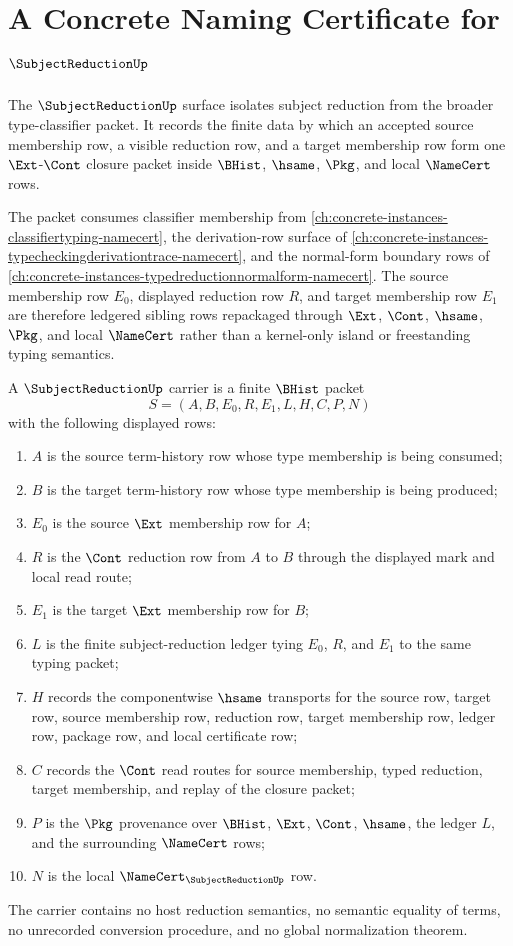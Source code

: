 \chapter{A Concrete Naming Certificate for $\SubjectReductionUp$}
\label{ch:concrete-instances-subjectreduction-namecert}

The $\SubjectReductionUp$ surface isolates subject reduction from the broader type-classifier packet. It records the finite data by which an accepted source membership row, a visible reduction row, and a target membership row form one $\Ext$-$\Cont$ closure packet inside $\BHist$, $\hsame$, $\Pkg$, and local $\NameCert$ rows.

The packet consumes classifier membership from \autoref{ch:concrete-instances-classifiertyping-namecert}, the derivation-row surface of \autoref{ch:concrete-instances-typecheckingderivationtrace-namecert}, and the normal-form boundary rows of \autoref{ch:concrete-instances-typedreductionnormalform-namecert}. The source membership row $E_0$, displayed reduction row $R$, and target membership row $E_1$ are therefore ledgered sibling rows repackaged through $\Ext$, $\Cont$, $\hsame$, $\Pkg$, and local $\NameCert$ rather than a kernel-only island or freestanding typing semantics.

\begin{definition}
\label{def:subject-reduction-namecert-carrier}
A $\SubjectReductionUp$ carrier is a finite $\BHist$ packet
$$
S=(A,B,E_0,R,E_1,L,H,C,P,N)
$$
with the following displayed rows:
\begin{enumerate}
\item $A$ is the source term-history row whose type membership is being consumed;
\item $B$ is the target term-history row whose type membership is being produced;
\item $E_0$ is the source $\Ext$ membership row for $A$;
\item $R$ is the $\Cont$ reduction row from $A$ to $B$ through the displayed mark and local read route;
\item $E_1$ is the target $\Ext$ membership row for $B$;
\item $L$ is the finite subject-reduction ledger tying $E_0$, $R$, and $E_1$ to the same typing packet;
\item $H$ records the componentwise $\hsame$ transports for the source row, target row, source membership row, reduction row, target membership row, ledger row, package row, and local certificate row;
\item $C$ records the $\Cont$ read routes for source membership, typed reduction, target membership, and replay of the closure packet;
\item $P$ is the $\Pkg$ provenance over $\BHist$, $\Ext$, $\Cont$, $\hsame$, the ledger $L$, and the surrounding $\NameCert$ rows;
\item $N$ is the local $\NameCert_{\SubjectReductionUp}$ row.
\end{enumerate}
The carrier contains no host reduction semantics, no semantic equality of terms, no unrecorded conversion procedure, and no global normalization theorem.
\end{definition}

